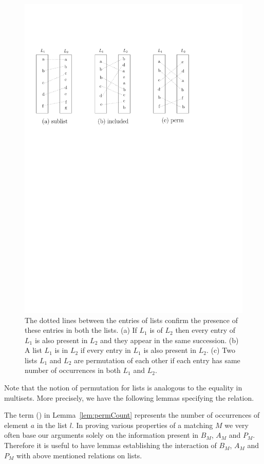\documentclass[a4paper,UKenglish,cleveref, autoref]{lipics-v2019}
\begin{document}
\begin{lemma}
\end{lemma}

\begin{figure}[h!]
\centering
\includegraphics[width=.5\textwidth]{sub_inclu_perm.pdf}
\caption{The dotted lines between the entries of lists confirm the presence of these entries in both the lists. (a) If $L_1$ is  of $L_2$ then every entry of $L_1$ is also present in $L_2$ and they appear in the same succession. (b) A list $L_1$ is  in $L_2$ if every entry in $L_1$ is also present in $L_2$. (c) Two lists $L_1$ and $L_2$ are permutation of each other if each entry has same number of occurrences in both  $L_1$ and $L_2$. }
\label{fig:list}
\end{figure}


Note that the notion of permutation for lists is analogous to the equality in multisets. More precisely, we have the following lemmas specifying the  relation.

\begin{lemma}\label{lem:permCount} 
\end{lemma}
\begin{lemma}
\end{lemma}

The term (\emph{}) in Lemma~\ref{lem:permCount}  represents the number of occurrences of element $a$ in the list $l$. In proving various properties of a matching $M$ we very often base our arguments solely on the information present in $B_M$, $A_M$ and $P_M$. Therefore it is useful to have lemmas establishing the interaction of  $B_M$, $A_M$ and $P_M$ with above mentioned relations on lists. 
\end{document}
